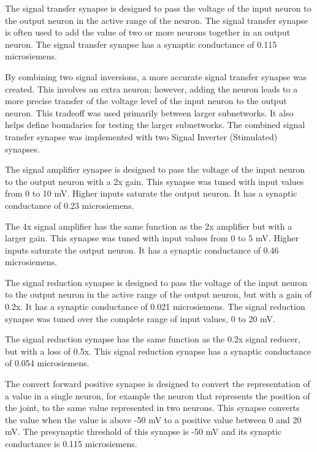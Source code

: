 
The signal transfer synapse is designed to pass the voltage of the input neuron
to the output neuron in the active range of the neuron. The signal transfer synapse is often used to add
the value of two or more neurons together in an output neuron.
The signal transfer synapse has a synaptic 
conductance of 0.115 microsiemens. 


By combining two signal inversions, a more accurate signal transfer synapse was
created. This involves an extra neuron; however, adding the neuron leads to a more precise
transfer of the voltage level of the input neuron to the output neuron. This tradeoff was used primarily between larger subnetworks. It also helps define boundaries for testing the larger subnetworks. The combined signal transfer synapse was implemented with two Signal Inverter (Stimulated)
synapses.


The signal amplifier synapse is designed to pass the voltage of the input neuron
to the output neuron with a 2x gain. This synapse was tuned with input values from 0 to
10 mV. Higher inputs saturate the output neuron. It has a synaptic conductance
of 0.23 microsiemens.


The 4x signal amplifier has the same function as the 2x amplifier but with a larger 
gain. This synapse was tuned with input values from 0 to
5 mV. Higher inputs saturate the output neuron. It has a synaptic conductance
of 0.46 microsiemens.


The signal reduction synapse is designed to pass the voltage of the input neuron
to the output neuron in the active range of the output neuron, but with a gain of 0.2x. 
It has a synaptic  conductance of 0.021 microsiemens. The signal reduction synapse was tuned
over the complete range of input values, 0 to 20 mV.


The signal reduction synapse has the same function as the 0.2x signal reducer, but with a loss of 0.5x. This signal reduction synapse has a synaptic  conductance of 0.054 microsiemens.


The convert forward positive synapse is designed to convert the representation
of a value in a single neuron, for example the neuron that represents the 
position of the joint, to the same value represented in two neurons. This
synapse converts the value when the value is above -50 mV to a positive value between 0 
and 20 mV. The presynaptic
threshold of this synapse is -50 mV and its synaptic conductance is 0.115 microsiemens.

